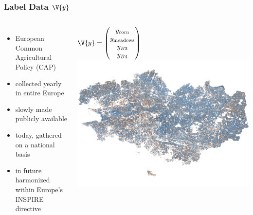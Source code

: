 \documentclass[%
  aspectratio=169,
  9pt,
  USenglish,
  titlegraphic, %
  affiliationintitlepagehead,
  affiliation,
]{beamer}
\begin{document}




\begin{frame}
	\frametitle{Label Data $\V{y}$}
	
	\begin{columns}
		
	
	\begin{itemize}\setlength\itemsep{.1em}
		\item European Common Agricultural Policy (CAP)
		\item collected yearly in entire Europe
		\item slowly made publicly available
		\item today, gathered on a national basis
		\item in future harmonized within Europe's INSPIRE directive
	\end{itemize}
	$
	\V{y} = \begin{pmatrix}
		y_\text{corn} \\ 
		y_\text{meadows} \\
		y_{B3} \\
		y_{B4} \\
	\end{pmatrix}
	$
	\includegraphics[width=\textwidth]{images/map/breizh}
	
	
	\end{columns}
\end{frame}
\end{document}
